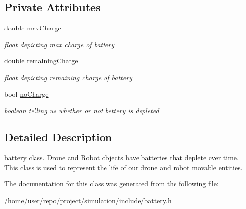 \subsection*{Private Attributes}
\begin{DoxyCompactItemize}
\item 
\mbox{\label{classBattery_aa467c83e0fd2ea2d57d98f9e2dc341db}} 
double \hyperlink{classBattery_aa467c83e0fd2ea2d57d98f9e2dc341db}{max\+Charge}
\begin{DoxyCompactList}\small\item\em float depicting max charge of battery \end{DoxyCompactList}\item 
\mbox{\label{classBattery_a4d012fbe92b40862bab89ce0019b7c0a}} 
double \hyperlink{classBattery_a4d012fbe92b40862bab89ce0019b7c0a}{remaining\+Charge}
\begin{DoxyCompactList}\small\item\em float depicting remaining charge of battery \end{DoxyCompactList}\item 
\mbox{\label{classBattery_ac008f63a4d81761cc72fbae7356d8ff7}} 
bool \hyperlink{classBattery_ac008f63a4d81761cc72fbae7356d8ff7}{no\+Charge}
\begin{DoxyCompactList}\small\item\em boolean telling us whether or not bettery is depleted \end{DoxyCompactList}\end{DoxyCompactItemize}


\subsection{Detailed Description}
battery class. \hyperlink{classDrone}{Drone} and \hyperlink{classRobot}{Robot} objects have batteries that deplete over time. This class is used to represent the life of our drone and robot movable entities. 

The documentation for this class was generated from the following file\+:\begin{DoxyCompactItemize}
\item 
/home/user/repo/project/simulation/include/\hyperlink{battery_8h}{battery.\+h}\end{DoxyCompactItemize}
